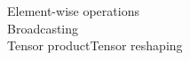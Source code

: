 \documentclass[preview]{standalone}
\begin{document}
Element-wise operations\\Broadcasting\\Tensor productTensor reshaping\\
\end{document}
